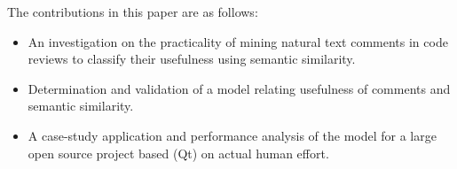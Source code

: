 The contributions in this paper are as follows:
\begin{itemize}
\item An investigation on the practicality of mining natural text comments in code reviews to classify their usefulness using semantic similarity.
\item Determination and validation of a model relating usefulness of comments and semantic similarity.
\item A case-study application and performance analysis of the model for a large open source project based (Qt) on actual human effort.
\end{itemize}





